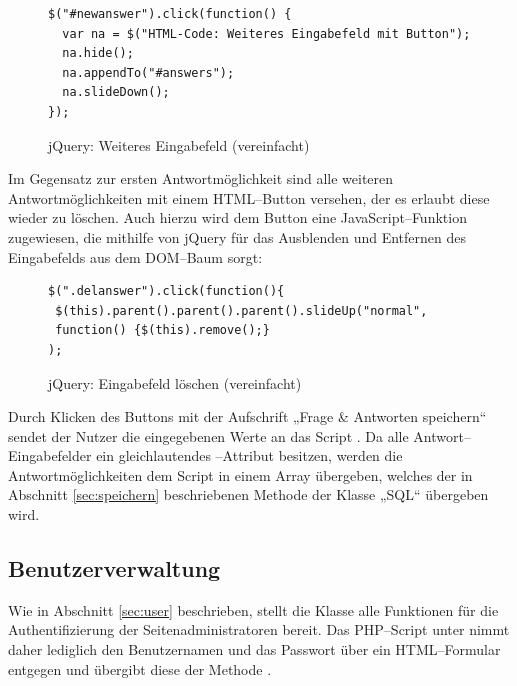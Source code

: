 \begin{figure}[H]
\begin{spacing}{1.0}
\begin{verbatim}
$("#newanswer").click(function() {
  var na = $("HTML-Code: Weiteres Eingabefeld mit Button");
  na.hide();
  na.appendTo("#answers");
  na.slideDown();	
});
\end{verbatim}
\caption{jQuery: Weiteres Eingabefeld (vereinfacht)}
\label{jquery:weitereantwort}
\end{spacing}
\end{figure}

Im Gegensatz zur ersten Antwortmöglichkeit sind alle weiteren Antwortmöglichkeiten mit einem HTML--Button versehen, der es erlaubt diese wieder zu löschen. Auch hierzu wird dem Button eine JavaScript--Funktion zugewiesen, die mithilfe von jQuery für das Ausblenden und Entfernen des Eingabefelds aus dem DOM--Baum sorgt:

\begin{figure}[H]
\begin{spacing}{1.0}
\begin{verbatim}
$(".delanswer").click(function(){
 $(this).parent().parent().parent().slideUp("normal",
 function() {$(this).remove();}
);
\end{verbatim}
\caption{jQuery: Eingabefeld löschen (vereinfacht)}
\label{jquery:antwortloeschen}
\end{spacing}
\end{figure}

Durch Klicken des Buttons mit der Aufschrift „Frage \& Antworten speichern“ sendet der Nutzer die eingegebenen Werte an das Script . Da alle Antwort--Eingabefelder ein gleichlautendes --Attribut besitzen, werden die Antwortmöglichkeiten dem Script in einem Array übergeben, welches der in Abschnitt \ref{sec:speichern} beschriebenen Methode der Klasse „SQL“ übergeben wird.

\subsection{Benutzerverwaltung}

Wie in Abschnitt \ref{sec:user} beschrieben, stellt die Klasse  alle Funktionen für die Authentifizierung der Seitenadministratoren bereit. Das PHP--Script unter  nimmt daher lediglich den Benutzernamen und das Passwort über ein HTML--Formular entgegen und übergibt diese der Methode .

